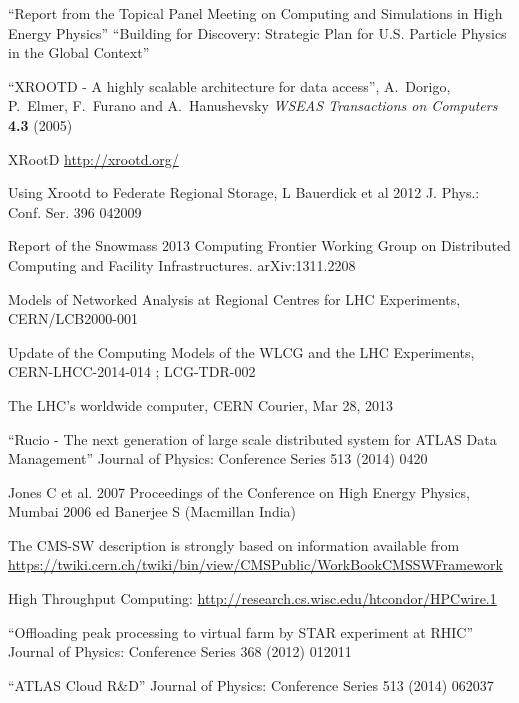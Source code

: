 \begin{thebibliography}{99}
 ``Report from the Topical Panel Meeting on Computing and
Simulations in High Energy Physics''
 ``Building for Discovery: Strategic Plan for U.S. Particle Physics in the Global Context''

 ``XROOTD - A highly scalable architecture for data access'', A.\ Dorigo, P.\ Elmer, F.\ Furano and A.\ Hanushevsky {\it WSEAS Transactions on Computers} {\bf 4.3} (2005)

 XRootD \url{http://xrootd.org/}

 Using Xrootd to Federate Regional Storage, L Bauerdick et al 2012 J. Phys.: Conf. Ser. 396 042009

 Report of the Snowmass 2013 Computing Frontier Working Group on Distributed Computing and Facility Infrastructures. arXiv:1311.2208

 Models of Networked Analysis at Regional Centres for LHC Experiments, CERN/LCB2000-001

 Update of the Computing Models of the WLCG and the LHC Experiments, CERN-LHCC-2014-014 ; LCG-TDR-002

 The LHC’s worldwide computer, CERN Courier, Mar 28, 2013

 ``Rucio - The next generation of large scale distributed system for ATLAS Data Management'' Journal of Physics: Conference Series 513 (2014) 0420


 Jones C et al. 2007 Proceedings of the Conference on High Energy Physics, Mumbai 2006 ed Banerjee S (Macmillan India)

 The CMS-SW description is strongly based on information available from \url{https://twiki.cern.ch/twiki/bin/view/CMSPublic/WorkBookCMSSWFramework}

 High Throughput Computing: \url{http://research.cs.wisc.edu/htcondor/HPCwire.1}

 ``Offloading peak processing to virtual farm by STAR experiment at RHIC'' Journal of Physics: Conference Series 368 (2012) 012011

 ``ATLAS Cloud R\&D'' Journal of Physics: Conference Series 513 (2014) 062037


\end{thebibliography}
